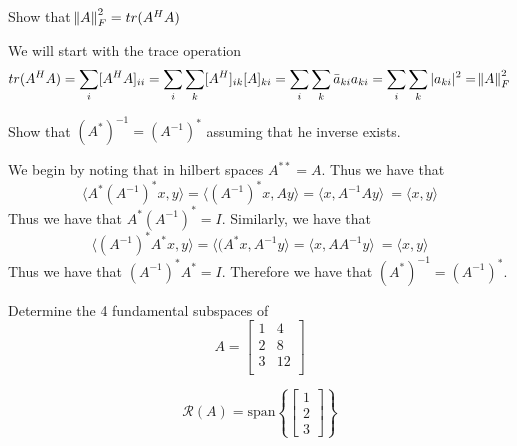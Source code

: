 \documentclass{homework}
\begin{document}
\begin{problem}[4-15]
  Show that $\norm{A}_F^2 = tr(A^HA)$ 
\end{problem}

\begin{solution}
  We will start with the trace operation
  \[ tr(A^HA) = \sum_{i} [A^HA]_{ii} = \sum_{i} \sum_{k} [A^H]_{ik}[A]_{ki} = \sum_{i} \sum_{k} \bar{a}_{ki} a_{ki} = 
  \sum_{i} \sum_{k} |a_{ki}|^2 = \norm{A}_F^2\]
\end{solution}

\begin{problem}[4-25]
  Show that $(A^*)^{-1} = (A^{-1})^*$ assuming that he inverse exists.
\end{problem}

\begin{solution}
  We begin by noting that in hilbert spaces $A^{**} = A$. Thus we have that
  \[ \langle A^*(A^{-1})^*x, y \rangle = \langle (A^{-1})^*x, Ay\rangle = \langle x, A^{-1}Ay\rangle\ = \langle x, y\rangle\]
  Thus we have that  $A^{*}(A^{-1})^* = I$. Similarly, we have that
  \[ \langle (A^{-1})^*A^*x, y \rangle = \langle (A^*x, A^{-1}y\rangle = \langle x, AA^{-1}y\rangle\ = \langle x, y\rangle\]
  Thus we have that  $(A^{-1})^*A^* = I$. Therefore we have that $(A^*)^{-1} = (A^{-1})^*$.
\end{solution}

\begin{problem}[4-29]
  Determine the 4 fundamental subspaces of 
  \[A =
    \begin{bmatrix}
      1 & 4 \\
      2 & 8 \\
      3 & 12 \\
    \end{bmatrix}
  \]
\end{problem}

\begin{solution}

  $$
  \mathcal{R}(A) = \text{span} \left\{
    \begin{bmatrix}
     1 \\
     2 \\
     3
    \end{bmatrix}
  \right\}
  $$
\end{solution}
\end{document}
